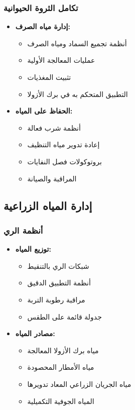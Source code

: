 \subsubsection{تكامل الثروة الحيوانية}
\begin{itemize}
    \item \textbf{إدارة مياه الصرف:}
    \begin{itemize}
        \item أنظمة تجميع السماد ومياه الصرف
        \item عمليات المعالجة الأولية
        \item تثبيت المغذيات
        \item التطبيق المتحكم به في برك الأزولا
    \end{itemize}
    
    \item \textbf{الحفاظ على المياه:}
    \begin{itemize}
        \item أنظمة شرب فعالة
        \item إعادة تدوير مياه التنظيف
        \item بروتوكولات فصل النفايات
        \item المراقبة والصيانة
    \end{itemize}
\end{itemize}

\subsection{إدارة المياه الزراعية}

\subsubsection{أنظمة الري}
\begin{itemize}
    \item \textbf{توزيع المياه:}
    \begin{itemize}
        \item شبكات الري بالتنقيط
        \item أنظمة التطبيق الدقيق
        \item مراقبة رطوبة التربة
        \item جدولة قائمة على الطقس
    \end{itemize}
    
    \item \textbf{مصادر المياه:}
    \begin{itemize}
        \item مياه برك الأزولا المعالجة
        \item مياه الأمطار المحصودة
        \item مياه الجريان الزراعي المعاد تدويرها
        \item المياه الجوفية التكميلية
    \end{itemize}
\end{itemize}

